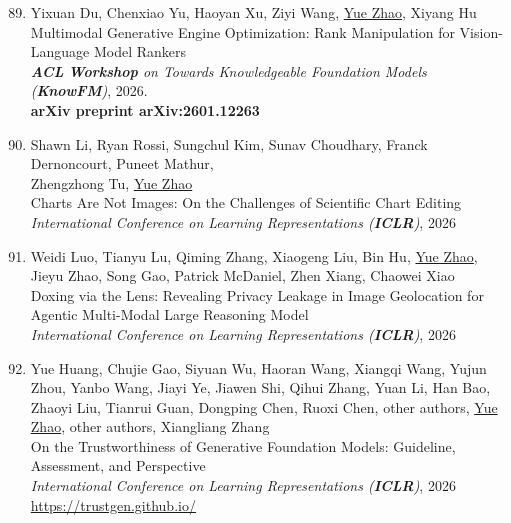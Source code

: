 \documentclass[margin,line,pifont,palatino,courier]{res}
\newenvironment{benumerate}[1]{
    \let\oldItem\item
    \def\item{\addtocounter{enumi}{-2}\oldItem}
    \begin{enumerate}[leftmargin=0.25in,label=\textcolor{uscred}{\arabic*.}]
    \setcounter{enumi}{#1}
    \addtocounter{enumi}{1}
}{
    \end{enumerate}
}
\begin{document}
\begin{resume}
\begin{benumerate}{88}
    \item
    Yixuan Du, Chenxiao Yu, Haoyan Xu, Ziyi Wang, \underline{Yue Zhao}, Xiyang Hu\\
    Multimodal Generative Engine Optimization: Rank Manipulation for Vision-Language Model Rankers\\
    \textit{\textbf{ACL} \textbf{Workshop} on Towards Knowledgeable Foundation Models (\textbf{KnowFM})}, 2026.\\
    \textbf{arXiv preprint arXiv:2601.12263}

    \item
    Shawn Li, Ryan Rossi, Sungchul Kim, Sunav Choudhary, Franck Dernoncourt, Puneet Mathur,\\
    Zhengzhong Tu, \underline{Yue Zhao} \\
    Charts Are Not Images: On the Challenges of Scientific Chart Editing \\
    {\textit{International Conference on Learning Representations (\textbf{ICLR})}, 2026}

    \item Weidi Luo, Tianyu Lu, Qiming Zhang, Xiaogeng Liu, Bin Hu, \underline{Yue Zhao}, Jieyu Zhao, Song Gao, Patrick McDaniel, Zhen Xiang, Chaowei Xiao\\
    Doxing via the Lens: Revealing Privacy Leakage in Image Geolocation for Agentic Multi-Modal Large Reasoning Model\\
    {\textit{International Conference on Learning Representations (\textbf{ICLR})}, 2026}
    
    \item 
    Yue Huang, Chujie Gao, Siyuan Wu, Haoran Wang, Xiangqi Wang, Yujun Zhou, Yanbo Wang, Jiayi Ye, Jiawen Shi, Qihui Zhang, Yuan Li, Han Bao, Zhaoyi Liu, Tianrui Guan, Dongping Chen, Ruoxi Chen, 
    other authors,
    \underline{Yue Zhao}, 
    other authors,
    Xiangliang Zhang\\
    On the Trustworthiness of Generative Foundation Models: Guideline, Assessment, and Perspective\\
    {\textit{International Conference on Learning Representations (\textbf{ICLR})}, 2026} \\
    \url{https://trustgen.github.io/}


\end{benumerate}
\end{resume}
\end{document}
